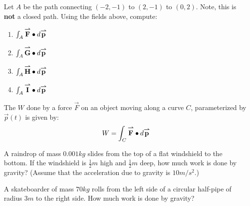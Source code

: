 \documentclass[noauthor,nooutcomes]{ximera}
\begin{document}
\begin{problem}
  Let $A$ be the path connecting $(-2,-1)$ to $(2,-1)$ to
  $(0,2)$. Note, this is \textbf{not} a closed path. Using the fields
  above, compute:
  \begin{enumerate}
  \item $\int_A {\overset{\boldsymbol{\rightharpoonup}}{\mathbf{F}}}\bullet \mathop{}\!d {\overset{\boldsymbol{\rightharpoonup}}{\mathbf{p}}}$
  \item $\int_A {\overset{\boldsymbol{\rightharpoonup}}{\mathbf{G}}}\bullet \mathop{}\!d {\overset{\boldsymbol{\rightharpoonup}}{\mathbf{p}}}$
  \item $\int_A {\overset{\boldsymbol{\rightharpoonup}}{\mathbf{H}}}\bullet \mathop{}\!d {\overset{\boldsymbol{\rightharpoonup}}{\mathbf{p}}}$
  \item $\int_A {\overset{\boldsymbol{\rightharpoonup}}{\mathbf{I}}}\bullet \mathop{}\!d {\overset{\boldsymbol{\rightharpoonup}}{\mathbf{p}}}$
  \end{enumerate}
\end{problem}


\begin{definition}
  The  $W$ done by a force $\vec{F}$ on an object moving
  along a curve $C$, parameterized by $\vec{p}(t)$ is given by:
  \[
  W = \int_C {\overset{\boldsymbol{\rightharpoonup}}{\mathbf{F}}}\bullet \mathop{}\!d {\overset{\boldsymbol{\rightharpoonup}}{\mathbf{p}}}
  \]
\end{definition}


\begin{problem}
  A raindrop of mass $0.001\unit{kg}$ slides from the top of a flat
  windshield to the bottom. If the windshield is $\frac{1}{2} \unit{m}$
  high and $\frac{1}{2}\unit{m}$ deep, how much work is done by
  gravity? (Assume that the acceleration due to gravity is $10
  \unit{m}/\unit{s}^2$.)
\end{problem}

\begin{problem}
  A skateboarder of mass $70\unit{kg}$ rolls from the left side of a
  circular half-pipe of radius $3\unit{m}$ to the right side. How much
  work is done by gravity?
  \begin{image}
  \end{image}
\end{problem}
\end{document}
